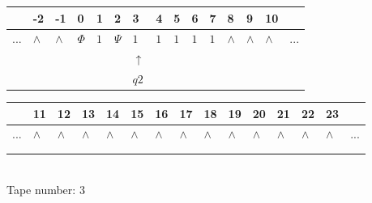 \documentclass[11pt]{article}
\begin{document}
\begin{table}[H]
\centering
\begin{tabular}{lllllllllllllll}
 & -2 & -1 & 0 & 1 & 2 & 3 & 4 & 5 & 6 & 7 & 8 & 9 & 10 & \\
\hline
$...$ & \multicolumn{1}{|l|}{$\wedge$} & \multicolumn{1}{|l|}{$\wedge$} & \multicolumn{1}{|l|}{$\Phi$} & \multicolumn{1}{|l|}{$1$} & \multicolumn{1}{|l|}{$\Psi$} & \multicolumn{1}{|l|}{$1$} & \multicolumn{1}{|l|}{$1$} & \multicolumn{1}{|l|}{$1$} & \multicolumn{1}{|l|}{$1$} & \multicolumn{1}{|l|}{$1$} & \multicolumn{1}{|l|}{$\wedge$} & \multicolumn{1}{|l|}{$\wedge$} & \multicolumn{1}{|l|}{$\wedge$} & $...$\\
\hline
&  &  &  &  &  & $\uparrow$ &  &  &  &  &  &  &  &  \\
&  &  &  &  &  & $ q2 $ &  &  &  &  &  &  &  &  \\
\end{tabular}
\begin{tabular}{lllllllllllllll}
 & 11 & 12 & 13 & 14 & 15 & 16 & 17 & 18 & 19 & 20 & 21 & 22 & 23 & \\
\hline
$...$ & \multicolumn{1}{|l|}{$\wedge$} & \multicolumn{1}{|l|}{$\wedge$} & \multicolumn{1}{|l|}{$\wedge$} & \multicolumn{1}{|l|}{$\wedge$} & \multicolumn{1}{|l|}{$\wedge$} & \multicolumn{1}{|l|}{$\wedge$} & \multicolumn{1}{|l|}{$\wedge$} & \multicolumn{1}{|l|}{$\wedge$} & \multicolumn{1}{|l|}{$\wedge$} & \multicolumn{1}{|l|}{$\wedge$} & \multicolumn{1}{|l|}{$\wedge$} & \multicolumn{1}{|l|}{$\wedge$} & \multicolumn{1}{|l|}{$\wedge$} & $...$\\
\hline
&  &  &  &  &  &  &  &  &  &  &  &  &  &  \\
&  &  &  &  &  &  &  &  &  &  &  &  &  &  \\
\end{tabular}
\\
Tape number: 3
\noindent\makebox[\linewidth]{\hdashrule{\textwidth}{1pt}{1pt}}\end{table}
\clearpage
\end{document}
